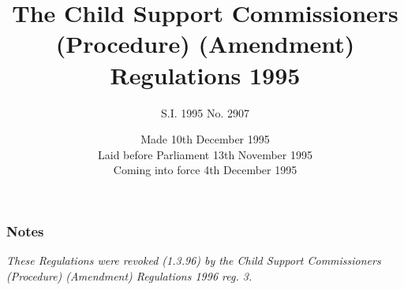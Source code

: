 \documentclass[a4paper]{article}
\title{The Child Support Commissioners (Procedure) (Amendment) Regulations 1995}
\author{S.I. 1995 No. 2907}
\date{Made 10th December 1995\\Laid before Parliament 13th November 1995\\Coming into force 4th December 1995}
\newcommand\amendment[1]{\subsubsection*{Notes}{\itshape\frenchspacing\footnotesize #1 \par}}
\begin{document}
\maketitle


\amendment{
These Regulations were revoked (1.3.96) by the Child Support Commissioners (Procedure) (Amendment) Regulations 1996 reg. 3.
}

%
%
%
%
%
%
%
%
%
%
%
%
%
\end{document}
